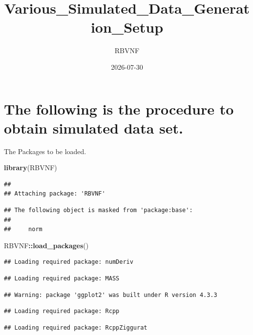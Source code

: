 \documentclass[
]{article}
\title{Various\_Simulated\_Data\_Generation\_Setup}
\author{RBVNF}
\date{2026-07-30}
\newenvironment{Shaded}{\begin{snugshade}}{\end{snugshade}}
\newcommand{\FunctionTok}[1]{\textcolor[rgb]{0.13,0.29,0.53}{\textbf{#1}}}
\newcommand{\NormalTok}[1]{#1}
\newcommand{\SpecialCharTok}[1]{\textcolor[rgb]{0.81,0.36,0.00}{\textbf{#1}}}
\begin{document}
\maketitle

\hypertarget{the-following-is-the-procedure-to-obtain-simulated-data-set.}{%
\section{The following is the procedure to obtain simulated data
set.}\label{the-following-is-the-procedure-to-obtain-simulated-data-set.}}

The Packages to be loaded.

\begin{Shaded}
\begin{Highlighting}[]
\FunctionTok{library}\NormalTok{(RBVNF)}
\end{Highlighting}
\end{Shaded}

\begin{verbatim}
## 
## Attaching package: 'RBVNF'
\end{verbatim}

\begin{verbatim}
## The following object is masked from 'package:base':
## 
##     norm
\end{verbatim}

\begin{Shaded}
\begin{Highlighting}[]
\NormalTok{RBVNF}\SpecialCharTok{::}\FunctionTok{load\_packages}\NormalTok{()}
\end{Highlighting}
\end{Shaded}

\begin{verbatim}
## Loading required package: numDeriv
\end{verbatim}

\begin{verbatim}
## Loading required package: MASS
\end{verbatim}

\begin{verbatim}
## Warning: package 'ggplot2' was built under R version 4.3.3
\end{verbatim}

\begin{verbatim}
## Loading required package: Rcpp
\end{verbatim}

\begin{verbatim}
## Loading required package: RcppZiggurat
\end{verbatim}
\end{document}
